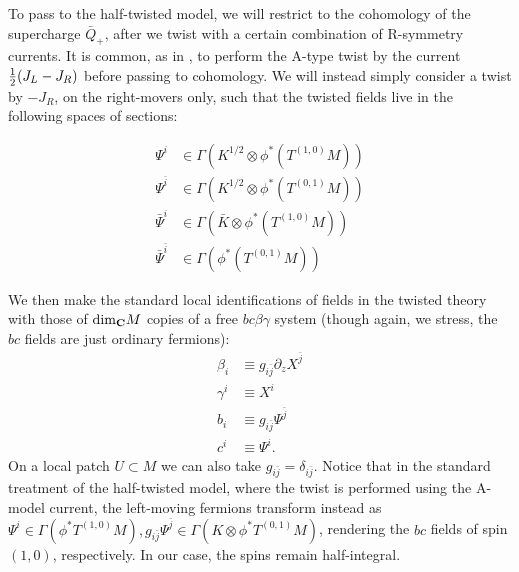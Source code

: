 \documentclass[11pt]{amsart}
\newcommand{\C}{\mathbf C}
\theoremstyle{thm}
\numberwithin{equation}{subsection}
\theoremstyle{def}
\theoremstyle{rem}
\begin{document}
To pass to the half-twisted model, we will restrict to the cohomology of the supercharge $\bar{Q}_+$, after we twist with a certain combination of R-symmetry currents. It is common, as in  \cite{Kapustin}, to perform the A-type twist by the current ${1 \over 2}(J_L - J_R)$ before passing to cohomology. We will instead simply consider a twist by $-J_R$, on the right-movers only, such that the twisted fields live in the following spaces of sections:

\begin{align*}
\Psi^i &\in \Gamma(K^{1/2}\otimes \phi^*(T^{(1,0)}M))\\
\Psi^{\bar{i}} &\in \Gamma(K^{1/2}\otimes \phi^*(T^{(0,1)}M))\\
\bar{\Psi}^i &\in \Gamma(\bar{K} \otimes\phi^*(T^{(1,0)}M))\\
\bar{\Psi}^{\bar{i}} &\in  \Gamma(\phi^*(T^{(0,1)}M))
\end{align*} 

We then make the standard local identifications of fields in the twisted theory with those of ${\rm dim}_{\C}M$ copies of a free $bc\beta\gamma$ system (though again, we stress, the $bc$ fields are just ordinary fermions):
\begin{align*}
\beta_i &\equiv g_{i \bar{j}}\partial_z X^{\bar{j}} \\
\gamma^i &\equiv X^i \\
b_i &\equiv g_{i \bar{j}} \Psi^{\bar{j}} \\
c^i &\equiv \Psi^i.
\end{align*}
On a local patch $U \subset M$ we can also take $g_{i\bar{j}} = \delta_{i \bar{j}}$.
Notice that in the standard treatment of the half-twisted model, where the twist is performed using the A-model current, the left-moving fermions transform instead as $\Psi^i \in \Gamma(\phi^* T^{(1, 0)}M), g_{i \bar{j}}\Psi^{\bar{j}} \in \Gamma(K \otimes \phi^* T^{(0, 1)}M)$, rendering the $bc$ fields of spin $(1, 0)$, respectively. In our case, the spins remain half-integral.
\end{document}
